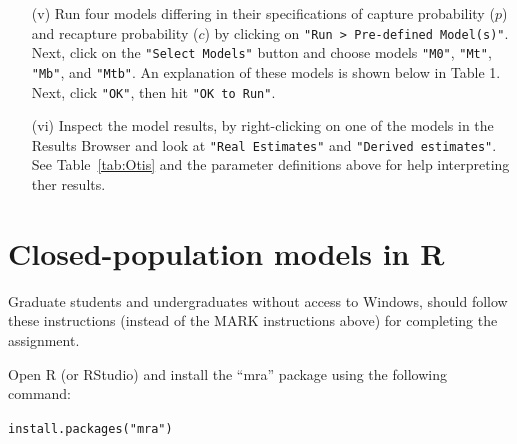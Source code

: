 \documentclass[12pt]{article}\usepackage[]{graphicx}\usepackage[]{color}
\makeatletter
\newcommand{\hlstr}[1]{\textcolor[rgb]{0.749,0.012,0.012}{#1}}%
\newcommand{\hlstd}[1]{\textcolor[rgb]{0,0,0}{#1}}%
\newcommand{\hlkwd}[1]{\textcolor[rgb]{0.004,0.004,0.506}{#1}}%
\newenvironment{kframe}{%
 \def\at@end@of@kframe{}%
 \ifinner\ifhmode%
  \def\at@end@of@kframe{\end{minipage}}%
  \begin{minipage}{\columnwidth}%
 \fi\fi%
 \def\FrameCommand##1{\hskip\@totalleftmargin \hskip-\fboxsep
 \colorbox{shadecolor}{##1}\hskip-\fboxsep
     \hskip-\linewidth \hskip-\@totalleftmargin \hskip\columnwidth}%
 \MakeFramed {\advance\hsize-\width
   \@totalleftmargin\z@ \linewidth\hsize
   \@setminipage}}%
 {\par\unskip\endMakeFramed%
 \at@end@of@kframe}
\newenvironment{knitrout}{}{} %
\makeatother
\begin{document}
\begin{enumerate}
  \item[(v)] Run four models differing in their specifications of
    capture probability ($p$) and recapture probability ($c$) by
    clicking on  \verb+"Run > Pre-defined Model(s)"+. Next, click on the
    \verb+"Select Models"+ button and choose models \verb+"M0"+,
    \verb+"Mt"+, \verb+"Mb"+, and \verb+"Mtb"+. An explanation of these
    models is shown below in Table 1. Next, click \verb+"OK"+, then
    hit \verb+"OK to Run"+. 
  \item[(vi)] Inspect the model results, by right-clicking on one of
    the models in the Results Browser and look at
    \verb+"Real Estimates"+ and \verb+"Derived estimates"+. See
    Table~\ref{tab:Otis} and the parameter definitions above for help
    interpreting ther results.
\end{enumerate}



\clearpage


\section*{Closed-population models in R}


Graduate students and undergraduates without access to Windows, should
follow these instructions (instead of the MARK instructions above) for
completing the assignment. 

Open R (or RStudio) and install the ``mra'' package using the
following command: 

\begin{knitrout}
\color{fgcolor}\begin{kframe}
\begin{alltt}
\hlkwd{install.packages}\hlstd{(}\hlstr{"mra"}\hlstd{)}
\end{alltt}
\end{kframe}
\end{knitrout}
\end{document}
